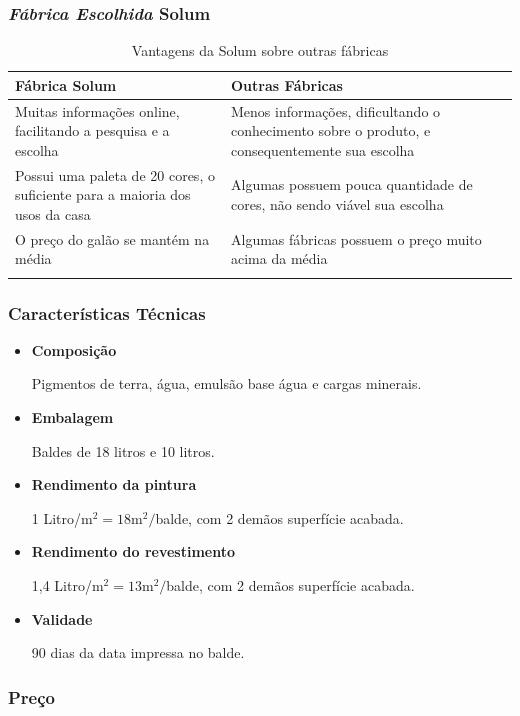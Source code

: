 \subsubsection*{\textit{Fábrica Escolhida} \textbf{Solum}}

\begin{longtable}{|m{7cm}|m{7cm}|}
\hline 
Fábrica Solum & Outras Fábricas\tabularnewline
\hline 
\hline 
Muitas informações online, facilitando a pesquisa e a escolha & Menos informações, dificultando o conhecimento sobre o produto, e
consequentemente sua escolha\tabularnewline
\hline 
Possui uma paleta de 20 cores, o suficiente para a maioria dos usos
da casa & Algumas possuem pouca quantidade de cores, não sendo viável sua escolha\tabularnewline
\hline 
O preço do galão se mantém na média & Algumas fábricas possuem o preço muito acima da média\tabularnewline
\hline 
\caption{Vantagens da Solum sobre outras fábricas}
\end{longtable}

\subsubsection*{\textbf{Características Técnicas}}
	
	\begin{itemize}
		
		\item \textbf{Composição}
		
		Pigmentos de terra, água, emulsão base água e cargas minerais.
		
		\item \textbf{Embalagem}
		
		Baldes de 18 litros e 10 litros.
		
		\item \textbf{Rendimento da pintura}
		
		1 Litro/$\si{\meter}^{2} = 18\si{\meter}^{2}/$balde, com 2 demãos superfície acabada.
		
		\item \textbf{Rendimento do revestimento}
		
		1,4 Litro/$\si{\meter}^{2} = 13\si{\meter}^{2}/$balde, com 2 demãos superfície acabada.
		
		\item \textbf{Validade}
		
		90 dias da data impressa no balde.
	
	\end{itemize}

\subsubsection*{\textbf{Preço}}

